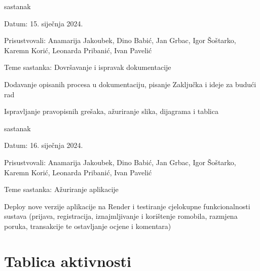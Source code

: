 \begin{packed_enum}
			\item  sastanak
			\item[] \begin{packed_item}
				\item Datum: 15. siječnja 2024.
				\item Prisustvovali: Anamarija Jakoubek, Dino Babić, Jan Grbac, Igor Šoštarko, Karemn Korić, Leonarda Pribanić, Ivan Pavelić
				\item Teme sastanka: Dovršavanje i ispravak dokumentacije
				\begin{packed_item}
					\item Dodavanje opisanih procesa u dokumentaciju, pisanje Zaključka i ideje za budući rad
					\item Ispravljanje pravopisnih grešaka, ažuriranje slika, dijagrama i tablica
				\end{packed_item}
			\end{packed_item}
			
			\item  sastanak
			\item[] \begin{packed_item}
				\item Datum: 16. siječnja 2024.
				\item Prisustvovali: Anamarija Jakoubek, Dino Babić, Jan Grbac, Igor Šoštarko, Karemn Korić, Leonarda Pribanić, Ivan Pavelić
				\item Teme sastanka: Ažuriranje aplikacije
				\begin{packed_item}
					\item Deploy nove verzije aplikacije na Render i testiranje cjelokupne funkcionalnosti sustava (prijava, registracija, iznajmljivanje i korištenje romobila, razmjena poruka, transakcije te ostavljanje ocjene i komentara)
				\end{packed_item}
			\end{packed_item}
			
			
		\end{packed_enum}
		
		\eject
		\section*{Tablica aktivnosti}

